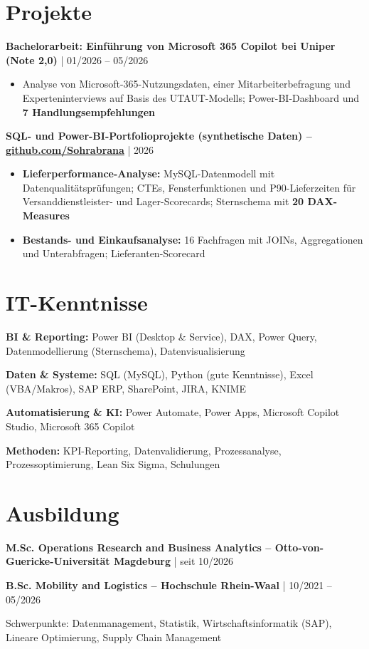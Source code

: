 \documentclass[10pt,a4paper]{article}
\newcommand{\entry}[2]{%
  \vspace{0.22em}%
  {\bfseries #1} | {\color{muted}#2}\par}
\newcommand{\skill}[2]{{\bfseries #1:} #2\par\vspace{0.12em}}
\begin{document}
\section{Projekte}

\entry{Bachelorarbeit: Einführung von Microsoft 365 Copilot bei Uniper (Note 2,0)}{01/2026 – 05/2026}
\begin{itemize}
  \item Analyse von Microsoft-365-Nutzungsdaten, einer Mitarbeiterbefragung und Experteninterviews auf Basis des UTAUT-Modells; Power-BI-Dashboard und \textbf{7 Handlungsempfehlungen}
\end{itemize}

\entry{SQL- und Power-BI-Portfolioprojekte (synthetische Daten) – \href{https://github.com/Sohrabrana}{github.com/Sohrabrana}}{2026}
\begin{itemize}
  \item \textbf{Lieferperformance-Analyse:} MySQL-Datenmodell mit Datenqualitätsprüfungen; CTEs, Fensterfunktionen und P90-Lieferzeiten für Versanddienstleister- und Lager-Scorecards; Sternschema mit \textbf{20 DAX-Measures}
  \item \textbf{Bestands- und Einkaufsanalyse:} 16 Fachfragen mit JOINs, Aggregationen und Unterabfragen; Lieferanten-Scorecard
\end{itemize}

\section{IT-Kenntnisse}
\skill{BI \& Reporting}{Power BI (Desktop \& Service), DAX, Power Query, Datenmodellierung (Sternschema), Datenvisualisierung}
\skill{Daten \& Systeme}{SQL (MySQL), Python (gute Kenntnisse), Excel (VBA/Makros), SAP ERP, SharePoint, JIRA, KNIME}
\skill{Automatisierung \& KI}{Power Automate, Power Apps, Microsoft Copilot Studio, Microsoft 365 Copilot}
\skill{Methoden}{KPI-Reporting, Datenvalidierung, Prozessanalyse, Prozessoptimierung, Lean Six Sigma, Schulungen}

\section{Ausbildung}
\entry{M.Sc. Operations Research and Business Analytics – Otto-von-Guericke-Universität Magdeburg}{seit 10/2026}
\entry{B.Sc. Mobility and Logistics – Hochschule Rhein-Waal}{10/2021 – 05/2026}
{\small Schwerpunkte: Datenmanagement, Statistik, Wirtschaftsinformatik (SAP), Lineare Optimierung, Supply Chain Management\par}
\end{document}
